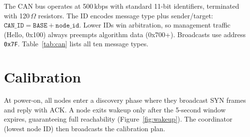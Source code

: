 \documentclass[10pt,twocolumn]{article}
\begin{document}
The CAN bus operates at 500\,kbps with standard 11-bit identifiers, terminated with 120\,$\Omega$ resistors. The ID encodes message type plus sender/target: $\texttt{CAN\_ID} = \texttt{BASE} + \texttt{node\_id}$. Lower IDs win arbitration, so management traffic (Hello, 0x100) always preempts algorithm data (0x700+). Broadcasts use address \texttt{0x7F}. Table~\ref{tab:can} lists all ten message types.

\begin{table}[H]
\centering
\caption{CAN message types and identifiers.}
\label{tab:can}
\end{table}

\section{Calibration}

At power-on, all nodes enter a discovery phase where they broadcast SYN frames and reply with ACK. A node exits wakeup only after the 5-second window expires, guaranteeing full reachability (Figure~\ref{fig:wakeup}). The coordinator (lowest node ID) then broadcasts the calibration plan.
\end{document}
